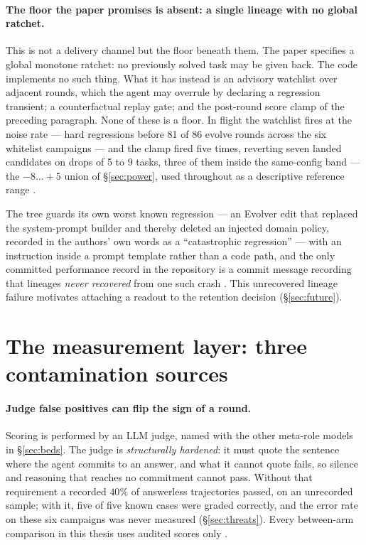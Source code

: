 \paragraph{The floor the paper promises is absent: a single lineage with
no global ratchet.} This is not a delivery channel but the floor beneath
them. The paper specifies a global monotone ratchet: no previously solved task may be
given back. The code implements no such thing. What it has instead is an
advisory watchlist over adjacent rounds, which the agent may overrule by
declaring a regression transient; a counterfactual replay gate; and the
post-round score clamp of the preceding paragraph. None of these is a floor. In flight the watchlist fires at the noise rate --- hard regressions
before 81 of 86 evolve rounds across the six whitelist campaigns --- and
the clamp fired five times, reverting seven landed candidates on drops of
5 to 9 tasks, three of them inside the same-config band --- the
$-8\ldots{+}5$ union of \S\ref{sec:power}, used throughout as a descriptive
reference range .

The tree guards its own worst known regression --- an Evolver edit that
replaced the system-prompt builder and thereby deleted an injected domain
policy, recorded in the authors' own words as a ``catastrophic
regression'' --- with an instruction inside a prompt template rather than
a code path, and the only committed performance record in the repository
is a commit message recording that lineages \emph{never recovered} from
one such crash . This unrecovered lineage failure motivates attaching a readout
to the retention decision (\S\ref{sec:future}).

\section{The measurement layer: three contamination sources}
\label{sec:measurement}

\paragraph{Judge false positives can flip the sign of a round.} Scoring is
performed by an LLM judge, named with the other meta-role models in
\S\ref{sec:beds}. The judge is \emph{structurally hardened}: it must quote
the sentence where the agent commits to an answer, and what it cannot quote
fails, so silence and reasoning that reaches no commitment cannot pass.
Without that requirement a recorded $40\%$ of answerless trajectories
passed, on an unrecorded sample; with it, five of five known cases were
graded correctly, and the error rate on these six campaigns was never
measured  (\S\ref{sec:threats}). Every between-arm comparison in this
thesis uses audited scores only .

